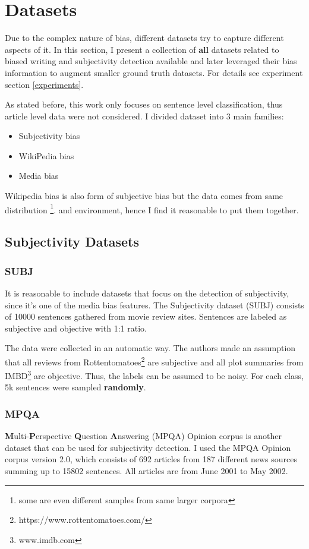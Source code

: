 \chapter{Datasets} \label{datasets}
Due to the complex nature of bias, different datasets try to capture different aspects of it. In this section, I present a collection of \textbf{all} datasets related to biased writing and subjectivity detection available and later leveraged their bias information to augment smaller ground truth datasets. For details see experiment section \ref{experiments}.

As stated before, this work only focuses on sentence level classification, thus article level data were not considered. I divided dataset into 3 main families: 
\begin{itemize}
    \item Subjectivity bias
    \item WikiPedia bias
    \item Media bias
\end{itemize}
Wikipedia bias is also form of subjective bias but the data comes from same distribution \footnote{some are even different samples from same larger corpora}. and environment, hence I find it reasonable to put them together.


\section{Subjectivity Datasets}

\subsection{SUBJ}
It is reasonable to include datasets that focus on the detection of subjectivity, since it's one of the media bias features. The Subjectivity dataset (SUBJ) \cite{Pang+Lee:04a} consists of 10000 sentences gathered from movie review sites. Sentences are labeled as subjective and objective with 1:1 ratio. 

The data were collected in an automatic way. The authors made an assumption that all reviews from Rottentomatoes\footnote{https://www.rottentomatoes.com/} are subjective and all plot summaries from IMBD\footnote{ www.imdb.com} are objective. Thus, the labels can be assumed to be noisy. For each class, 5k sentences were sampled \textbf{randomly}.




\subsection{MPQA}
\textbf{M}ulti-\textbf{P}erspective \textbf{Q}uestion \textbf{A}nswering (MPQA) Opinion corpus is another dataset that can be used for subjectivity detection. I used the MPQA Opinion corpus version 2.0, which consists of 692 articles from 187 different news sources summing up to 15802 sentences. All articles are from June 2001 to May 2002.

